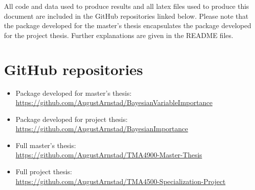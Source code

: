 All code and data used to produce results and all latex files used to produce this document are included in the GitHub repositories linked below. Please note that the package developed for the master's thesis encapsulates the package developed for the project thesis. Further explanations are given in the README files. 
\section{GitHub repositories}
\begin{itemize}
    \item Package developed for master's thesis:\\
    \url{https://github.com/AugustArnstad/BayesianVariableImportance}
    \item Package developed for project thesis:\\
    \url{https://github.com/AugustArnstad/BayesianImportance}
    \item Full master's thesis:\\
    \url{https://github.com/AugustArnstad/TMA4900-Master-Thesis}
    \item Full project thesis:\\
    \url{https://github.com/AugustArnstad/TMA4500-Specialization-Project}
\end{itemize}
